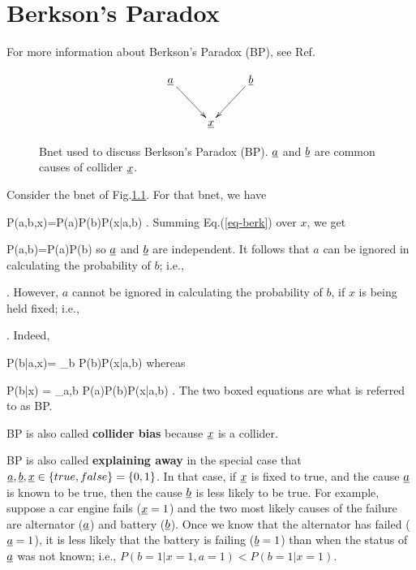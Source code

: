 \chapter{Berkson's Paradox}
\label{ch-berkson}

For more information
about Berkson's Paradox (BP), see
Ref.\cite{wiki-berkson}


\begin{figure}[h!]
$$
\xymatrix{
\rva\ar[rd]
&&\rvb\ar[ld]
\\
&\rvx
}
$$
\caption{
Bnet used to discuss Berkson's Paradox (BP).
${\underline{a}}$ and ${\underline{b}}$ are common causes of
collider
${\underline{x}}$.}
\label{fig-berkson-bnet}
\end{figure}

Consider the bnet of Fig.\ref{fig-berkson-bnet}.
For that bnet, we have

\beq
P(a,b,x)=P(a)P(b)P(x|a,b)
\;.
\label{eq-berk}
\eeq
Summing Eq.(\ref{eq-berk}) over $x$, we get

\beq
P(a,b)=P(a)P(b)
\eeq
so ${\underline{a}}$ and ${\underline{b}}$ are independent.
It follows that
$a$ can be ignored in calculating
the probability of $b$; i.e.,

\beq
{}
\;.
\eeq
However,
$a$ cannot be ignored in calculating
the probability of $b$,
if $x$ is being held fixed; i.e., 
 

\beq
{}
\;.
\eeq
Indeed,

\beq
P(b|a,x)=
{\sum_b P(b)P(x|a,b)}
\eeq
whereas

\beq
P(b|x)
=
{\sum_{a,b} P(a)P(b)P(x|a,b)}
\;.
\eeq
The two boxed 
equations are
what is referred to as BP.


BP is also called  {\bf collider bias} because 
${\underline{x}}$ is a collider.

BP is also called {\bf explaining away}
in the special case that
${\underline{a}},{\underline{b}}, {\underline{x}}\in \{true, false\}=\{0,1\}$.
In that case, if ${\underline{x}}$ is fixed
to true, and the cause
${\underline{a}}$ is known to be true, 
then the cause ${\underline{b}}$ is
less likely
to be true.
For example,
suppose a car engine fails (${\underline{x}}=1$)
and the two most likely
causes of the failure
are alternator (${\underline{a}}$)
and battery (${\underline{b}}$).
Once we know
that the alternator has failed
 (${\underline{a}}=1$), it is 
less likely that the
battery is failing (${\underline{b}}=1$)
than when the status of
${\underline{a}}$ was not known; i.e., 
$P(b=1|x=1,a=1)<P(b=1|x=1)$.


